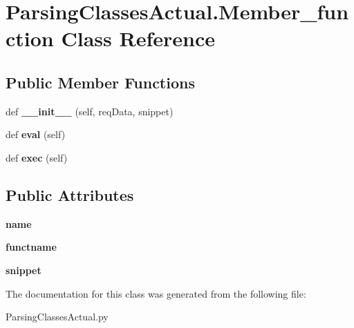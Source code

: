 \hypertarget{class_parsing_classes_actual_1_1_member__function}{}\section{Parsing\+Classes\+Actual.\+Member\+\_\+function Class Reference}
\label{class_parsing_classes_actual_1_1_member__function}
\subsection*{Public Member Functions}
\begin{DoxyCompactItemize}
\item 
\mbox{\label{class_parsing_classes_actual_1_1_member__function_abebf3cf5db29a8776c3144d7a7cf4fac}} 
def {\bfseries \+\_\+\+\_\+init\+\_\+\+\_\+} (self, req\+Data, snippet)
\item 
\mbox{\label{class_parsing_classes_actual_1_1_member__function_a33449b8ca04728cd8fe854830aa1d730}} 
def {\bfseries eval} (self)
\item 
\mbox{\label{class_parsing_classes_actual_1_1_member__function_aafcfb847d09b4dc16428bf10dd596bc1}} 
def {\bfseries exec} (self)
\end{DoxyCompactItemize}
\subsection*{Public Attributes}
\begin{DoxyCompactItemize}
\item 
\mbox{\label{class_parsing_classes_actual_1_1_member__function_ab05a5b7f454a630168fa27b9b543200d}} 
{\bfseries name}
\item 
\mbox{\label{class_parsing_classes_actual_1_1_member__function_a92b7dd050cca1f1fc59553b4f3d45223}} 
{\bfseries functname}
\item 
\mbox{\label{class_parsing_classes_actual_1_1_member__function_a819f607e7531d89e9c5954567e8373f8}} 
{\bfseries snippet}
\end{DoxyCompactItemize}


The documentation for this class was generated from the following file\+:\begin{DoxyCompactItemize}
\item 
Parsing\+Classes\+Actual.\+py\end{DoxyCompactItemize}
